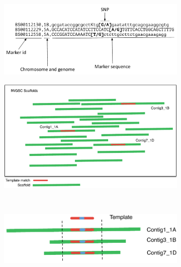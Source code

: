 \begin{figure}
    \centering
    \begin{subfigure}[b]{0.8\textwidth}
        \includegraphics[width=1\textwidth]{PolyMarker/Figures/aln/input.pdf} 
        \caption{}
        \label{fig:poly:input}
    \end{subfigure}

    \begin{subfigure}[b]{0.4\textwidth}
        \includegraphics[width=1\textwidth]{PolyMarker/Figures/aln/scaffoldsSearch.pdf}
        \caption{}
        \label{fig:poly:globalSearch}
    \end{subfigure}
    ~ %
    \begin{subfigure}[b]{0.4\textwidth}
        \raisebox{10mm} { \includegraphics[width=1\textwidth]{PolyMarker/Figures/aln/scaffoldsFoundAround.pdf} }
        \caption{}
        \label{fig:poly:globalAround} 
    \end{subfigure}
    

\end{figure}
